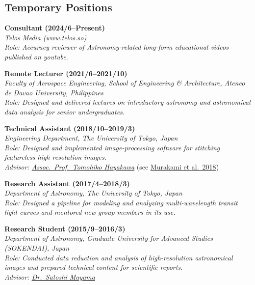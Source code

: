 \documentclass[12pt,letterpaper]{article}
\begin{document}
\subsection{Temporary Positions}
\begin{list}{}{\cvlist}
    \item 
        \textbf{Consultant (2024/6--Present)} \\
        \textit{Telos Media (www.telos.so)} \\
        \textit{Role: Accuracy reviewer of Astronomy-related long-form educational videos published on youtube.}
        
    \item
        \textbf{Remote Lecturer (2021/6--2021/10)} \\
        \textit{Faculty of Aerospace Engineering, School of Engineering \& Architecture, Ateneo de Davao University, Philippines} \\
        \textit{Role: Designed and delivered lectures on introductory astronomy and astronomical data analysis for senior undergraduates.}
        
    \item 
        \textbf{Technical Assistant (2018/10--2019/3)}\\
        \textit{Engineering Department, The University of Tokyo, Japan}\\
        \textit{Role: Designed and implemented image-processing software for stitching featureless high-resolution images.}\\
        \textit{Advisor: \href{hayakawaurl}{Assoc.\ Prof.\ Tomohiko Hayakawa}} (see \href{\spieurl}{Murakami et al.\ 2018})
        
    \item 
        \textbf{Research Assistant (2017/4--2018/3)}\\	
        \textit{Department of Astronomy, The University of Tokyo, Japan}\\
        \textit{Role: Designed a pipeline for modeling and analyzing multi-wavelength transit light curves and mentored new group members in its use.}
        
    \item 
        \textbf{Research Student (2015/9--2016/3)}\\
        \textit{Department of Astronomy, Graduate University for Advanced Studies (SOKENDAI), Japan}\\
        \textit{Role: Conducted data reduction and analysis of high-resolution astronomical images and prepared technical content for scientific reports.}\\
        \textit{Advisor: \href{\mayamaurl}{Dr.\ Satoshi Mayama}}
        

\end{list}
\end{document}
